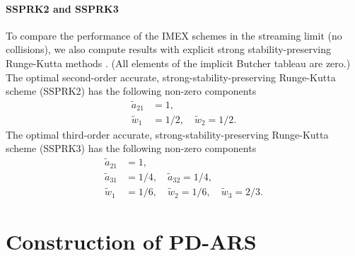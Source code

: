 \paragraph{SSPRK2 and SSPRK3}

To compare the performance of the IMEX schemes in the streaming limit (no collisions), we also compute results with explicit strong stability-preserving Runge-Kutta methods \cite{gottlieb_etal_2001}.  
(All elements of the implicit Butcher tableau are zero.)  
The optimal second-order accurate, strong-stability-preserving Runge-Kutta scheme (SSPRK2) has the following non-zero components
\begin{align}
  \tilde{a}_{21} &= 1, \nonumber \\ 
  \tilde{w}_{1}  &= 1/2, \quad \tilde{w}_{2} = 1/2. \nonumber 
\end{align}
The optimal third-order accurate, strong-stability-preserving Runge-Kutta scheme (SSPRK3) has the following non-zero components
\begin{align}
  \tilde{a}_{21} &= 1, \nonumber \\
  \tilde{a}_{31} &= 1/4, \quad \tilde{a}_{32} = 1/4, \nonumber \\
  \tilde{w}_{1} &= 1/6, \quad \tilde{w}_{2} = 1/6, \quad \tilde{w}_{3} =2/3. \nonumber
\end{align}

\newpage 
\section{Construction of PD-ARS}
\label{app:PD-ARS}

